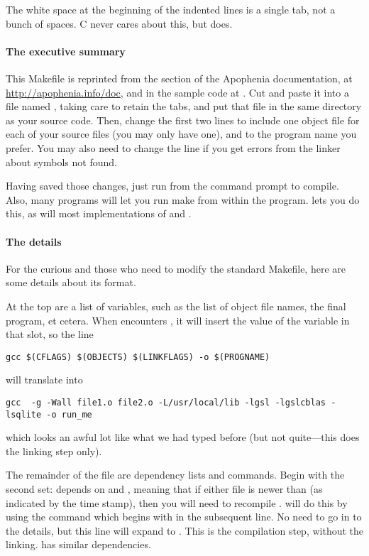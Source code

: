 The white space at the beginning of the indented lines is a single tab,
not a bunch of spaces.  C never cares about this, but 
does.

\paragraph{The executive summary} This Makefile is reprinted from the 
section of the Apophenia documentation, at
\url{http://apophenia.info/doc}, and in the sample code at 
\samplecodelocation. Cut and paste it into a file named
, taking care to retain the tabs, and put that file in
the same directory as your source code. Then, change the first two lines
to include one object file for each of your source files (you may only
have one), and
to the program name you prefer.  You may also need to change the
 line if you get errors from the linker about symbols
not found.

Having saved those changes, just run
 from the command prompt to compile.
Also, many programs will let you run
make from within the program.  lets you do this,
as will most implementations of  and .


\paragraph{The details} For the curious and those who need to modify
the standard Makefile, here are some details about its format.

At the top are a list of variables, such as the list of object file names, the final program, et cetera.
When  encounters , it will insert the value of the variable  in that
slot, so the line 
\begin{lstlisting}
gcc $(CFLAGS) $(OBJECTS) $(LINKFLAGS) -o $(PROGNAME)
\end{lstlisting}
will translate into
\begin{lstlisting}
gcc  -g -Wall file1.o file2.o -L/usr/local/lib -lgsl -lgslcblas -lsqlite -o run_me
\end{lstlisting}
which looks an awful lot like what we had typed before (but not quite---this does the linking step only).

The remainder of the file are dependency lists and commands. Begin
with the second set:  depends on  and , meaning that if either file is newer than 
(as indicated by the time stamp), then you will need to recompile .  will do this by using the command which begins with
 in the subsequent line. No need to go in to the details, but
this line will expand to . This
is the compilation step, without the linking.  has similar
dependencies.

